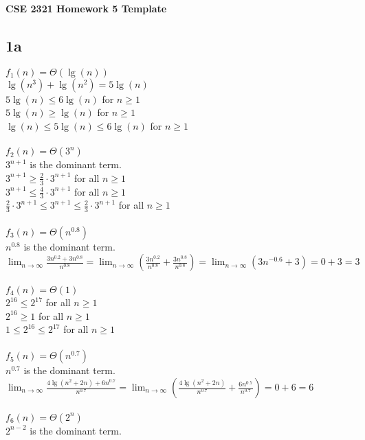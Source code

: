 \documentclass[14pt]{extarticle}
\begin{document}
\textbf{CSE 2321 Homework 5 Template}


\subsection*{1a}


$f_1(n) = \Theta(\lg(n))$ \\
$\lg(n^3) + \lg(n^2) = 5\lg(n)$ \\
$5\lg(n) \leq 6\lg(n)$ for $n \geq 1$ \\
$5\lg(n) \geq \lg(n)$ for $n \geq 1$ \\
$\lg(n) \leq 5\lg(n) \leq 6\lg(n)$ for $n \geq 1$ \\ \\
$f_2(n) = \Theta(3^n)$ \\
$3^{n+1}$ is the dominant term. \\
$3^{n+1} \geq \frac{2}{3} \cdot 3^{n+1}$ for all $n \geq 1$ \\
$3^{n+1} \leq \frac{4}{3} \cdot 3^{n+1}$ for all $n \geq 1$ \\
$\frac{2}{3} \cdot 3^{n+1} \leq 3^{n+1} \leq \frac{2}{3} \cdot 3^{n+1}$ for all $n \geq 1$ \\ \\
$f_3(n) = \Theta(n^{0.8})$ \\
$n^{0.8}$ is the dominant term.\\
$\lim_{n \to \infty} \frac{3n^{0.2} + 3n^{0.8}}{n^{0.8}} = \lim_{n \to \infty} \left(\frac{3n^{0.2}}{n^{0.8}} + \frac{3n^{0.8}}{n^{0.8}}\right) = \lim_{n \to \infty} (3n^{-0.6} + 3) = 0 + 3 = 3$ \\ \\
$f_4(n) = \Theta(1)$ \\
$2^{16} \leq 2^{17}$ for all $n \geq 1$ \\
$2^{16} \geq 1$ for all $n \geq 1$ \\
$1 \leq 2^{16} \leq 2^{17}$ for all $n \geq 1$ \\ \\
$f_5(n) = \Theta(n^{0.7})$ \\
$n^{0.7}$ is the dominant term. \\
$\lim_{n \to \infty} \frac{4\lg(n^2+2n)+6n^{0.7}}{n^{0.7}}
= \lim_{n \to \infty} \left(\frac{4\lg(n^2+2n)}{n^{0.7}} + \frac{6n^{0.7}}{n^{0.7}}\right) 
= 0 + 6 = 6 $ \\ \\
$f_6(n) = \Theta(2^n)$ \\
$2^{n-2}$ is the dominant term. \\
\end{document}
